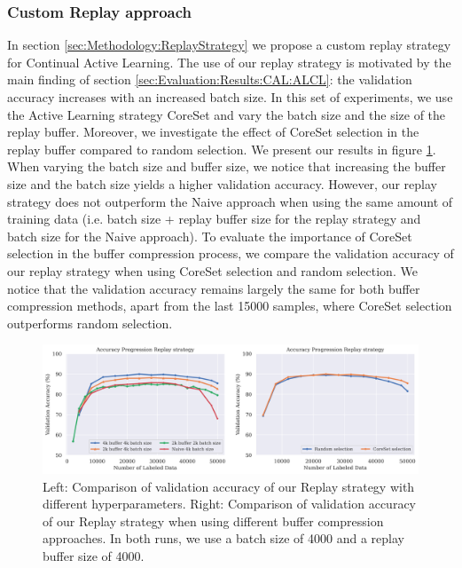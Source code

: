 \subsubsection{Custom Replay approach}
\label{sec:Evaluation:Results:CAL:Replay}
In section \ref{sec:Methodology:ReplayStrategy} we propose a custom replay strategy for Continual Active Learning. The use of our replay strategy is motivated by the main finding of section \ref{sec:Evaluation:Results:CAL:ALCL}: the validation accuracy increases with an
increased batch size. In this set of experiments, we use the Active Learning strategy CoreSet and vary the batch size and the size of the replay buffer. Moreover, we investigate the effect of CoreSet selection in the replay buffer compared to random selection. We present our
results in figure \ref{fig:Evaluation:Results:CAL:Replay}. When varying the batch size and buffer size, we notice that increasing the buffer size and the batch size yields a higher validation accuracy. However, our replay strategy does not outperform the Naive approach when using
the same amount of training data (i.e. batch size + replay buffer size for the replay strategy and batch size for the Naive approach). To evaluate the importance of CoreSet selection in the buffer compression process, we compare the validation accuracy of our replay strategy
when using CoreSet selection and random selection. We notice that the validation accuracy remains largely the same for both buffer compression methods, apart from the last 15000 samples, where CoreSet selection outperforms random selection. \par

\begin{figure}[h]
    \centering
    \includegraphics[width=\linewidth]{images/results_CAL/replay_CAL.png}
    \caption[Continual Active Learning Custom Replay strategy]{Left: Comparison of validation accuracy of our Replay strategy with different hyperparameters. Right: Comparison of validation accuracy of our Replay strategy when using different buffer compression approaches.
    In both runs, we use a batch size of 4000 and a replay buffer size of 4000.}
    \label{fig:Evaluation:Results:CAL:Replay}
\end{figure}

